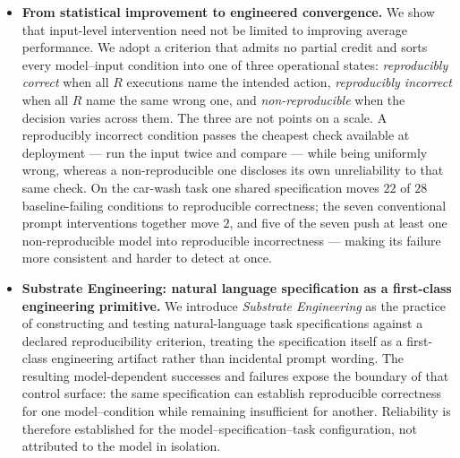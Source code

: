 \begin{itemize}\itemsep2pt

\item \textbf{From statistical improvement to engineered convergence.}
We show that input-level intervention need not be limited to improving average
performance. We adopt a criterion that admits no partial credit and sorts every
model--input condition into one of three operational states: \emph{reproducibly
correct} when all $R$ executions name the intended action, \emph{reproducibly
incorrect} when all $R$ name the same wrong one, and \emph{non-reproducible} when
the decision varies across them. The three are not points on a scale. A
reproducibly incorrect condition passes the cheapest check available at deployment
--- run the input twice and compare --- while being uniformly wrong, whereas a
non-reproducible one discloses its own unreliability to that same check. On the
car-wash task one shared specification moves $22$ of $28$ baseline-failing
conditions to reproducible correctness; the seven conventional prompt interventions
together move $2$, and five of the seven push at least one non-reproducible model
into reproducible incorrectness --- making its failure more consistent and harder to
detect at once.

\item \textbf{Substrate Engineering: natural language specification as a first-class engineering primitive.}
We introduce \emph{Substrate Engineering} as the practice of constructing and
testing natural-language task specifications against a declared reproducibility
criterion, treating the specification itself as a first-class engineering artifact
rather than incidental prompt wording. The resulting model-dependent successes and
failures expose the boundary of that control surface: the same specification can
establish reproducible correctness for one model--condition while remaining
insufficient for another. Reliability is therefore established for the
model--specification--task configuration, not attributed to the model in isolation.


\end{itemize}
